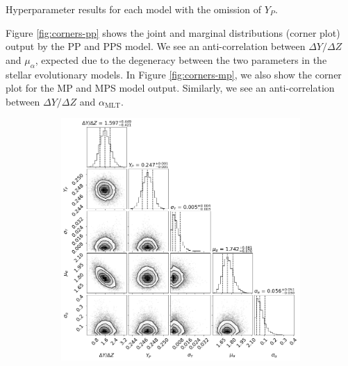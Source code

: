 \documentclass[a4paper,fleqn,usenatbib]{mnras}
\newcommand{\mlt}{\ensuremath{{\alpha_\mathrm{MLT}}}}
\begin{document}
\begin{table}
	\centering
	\caption{Hyperparameter results for each model with the omission of $Y_P$.}
	\label{tab:hparam_results}
	
\end{table}

Figure \ref{fig:corners-pp} shows the joint and marginal distributions (corner plot) output by the PP and PPS model. We see an anti-correlation between $\Delta Y / \Delta Z$ and $\mu_\alpha$, expected due to the degeneracy between the two parameters in the stellar evolutionary models. In Figure \ref{fig:corners-mp}, we also show the corner plot for the MP and MPS model output. Similarly, we see an anti-correlation between $\Delta Y / \Delta Z$ and $\mlt$.

\begin{figure}
    \begin{subfigure}[b]{.5\linewidth}
        \centering
        \includegraphics[width=\textwidth]{figures/corner_plot_pp.png}
    \end{subfigure}%
    \begin{subfigure}[b]{.5\linewidth}
        \centering

\end{subfigure}
\end{figure}
\end{document}
